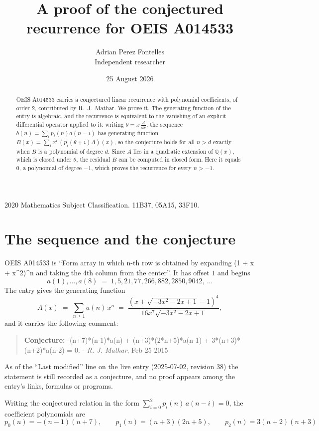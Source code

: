 \documentclass[11pt,a4paper]{article}
\title{A proof of the conjectured recurrence for OEIS A014533}
\author{Adrian Perez Fontelles\\ \small Independent researcher}
\date{25 August 2026}
\theoremstyle{plain}
\theoremstyle{definition}
\begin{document}
\maketitle

\begin{abstract}
OEIS A014533 carries a conjectured linear recurrence with polynomial coefficients, of
order 2, contributed by R.~J.~Mathar. We prove it. The generating function of the
entry is algebraic, and the recurrence is equivalent to the vanishing of an explicit
differential operator applied to it: writing $\theta=x\,\frac{d}{dx}$, the sequence
$b(n)=\sum_{i}p_{i}(n)a(n-i)$ has generating function
$B(x)=\sum_{i}x^{i}\,(p_{i}(\theta+i)A)(x)$, so the conjecture holds for all $n>d$ exactly
when $B$ is a polynomial of degree $d$. Since $A$ lies in a quadratic extension of
$\mathbb{Q}(x)$, which is closed under $\theta$, the residual $B$ can be computed in
closed form. Here it equals $0$, a polynomial of degree $-1$, which proves
the recurrence for every $n>-1$.
\end{abstract}

\noindent\small 2020 Mathematics Subject Classification. 11B37, 05A15, 33F10.\normalsize

\section{The sequence and the conjecture}

OEIS A014533 is ``Form array in which n-th row is obtained by expanding (1 + x + x\^{}2)\^{}n and taking the 4th column from the center''. It has offset $1$ and begins
\[
a(1),\dots,a(8)\;=\;1, 5, 21, 77, 266, 882, 2850, 9042,\ \dots
\]
The entry gives the generating function
\begin{equation}\label{eq:gf}
A(x)\;=\;\sum_{n\ge 1} a(n)\,x^{n}\;=\;\frac{\left(x + \sqrt{- 3 x^{2} - 2 x + 1} - 1\right)^{4}}{16 x^{7} \sqrt{- 3 x^{2} - 2 x + 1}} ,
\end{equation}
and it carries the following comment:
\begin{quote}\small
\textbf{Conjecture:} -(n+7)*(n-1)*a(n) + (n+3)*(2*n+5)*a(n-1) + 3*(n+3)*(n+2)*a(n-2) = 0. - \emph{R. J. Mathar}, Feb 25 2015
\end{quote}
As of the ``Last modified'' line on the live entry (2025-07-02, revision 38) the
statement is still recorded as a conjecture, and no proof appears among the entry's links,
formulas or programs.

Writing the conjectured relation in the form $\sum_{i=0}^{2}p_{i}(n)\,a(n-i)=0$,
the coefficient polynomials are
\[
p_{0}(n)=- \left(n - 1\right) \left(n + 7\right),\qquad p_{1}(n)=\left(n + 3\right) \left(2 n + 5\right),\qquad p_{2}(n)=3 \left(n + 2\right) \left(n + 3\right)
\]
\end{document}
